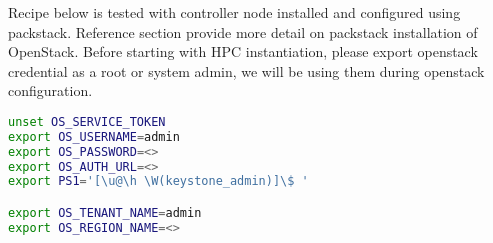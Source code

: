 Recipe below is tested with controller node installed and configured using packstack.
Reference section provide more detail on packstack installation of OpenStack.
Before starting with HPC instantiation, please export openstack credential as a root or system admin, we will be using them during openstack configuration. 

\begin{lstlisting}[language=bash,keywords={}]
unset OS_SERVICE_TOKEN
export OS_USERNAME=admin
export OS_PASSWORD=<>
export OS_AUTH_URL=<>
export PS1='[\u@\h \W(keystone_admin)]\$ '

export OS_TENANT_NAME=admin
export OS_REGION_NAME=<>  
\end{lstlisting}